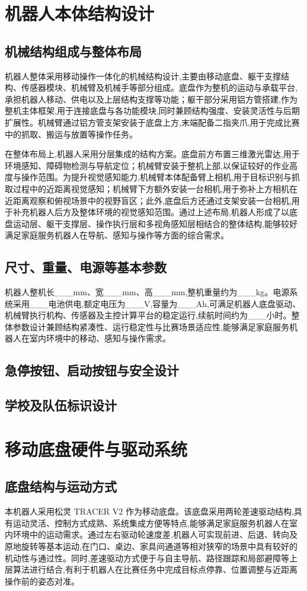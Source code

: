 \documentclass[12pt,hyperref,a4paper,UTF8]{ctexart}
\begin{document}
\section{机器人本体结构设计}
\subsection{机械结构组成与整体布局}
机器人整体采用移动操作一体化的机械结构设计,主要由移动底盘、躯干支撑结构、传感器模块、机械臂及机械手等部分组成。底盘作为整机的运动与承载平台,承担机器人移动、供电以及上层结构支撑等功能；躯干部分采用铝方管搭建,作为整机主体框架,用于连接底盘与各功能模块,同时兼顾结构强度、安装灵活性与后期扩展性。机械臂通过铝方管支架安装于底盘上方,末端配备二指夹爪,用于完成比赛中的抓取、搬运与放置等操作任务。

在整体布局上,机器人采用分层集成的结构方案。底盘前方布置三维激光雷达,用于环境感知、障碍物检测与导航定位；机械臂安装于整机上部,以保证较好的作业高度与操作范围。为提升视觉感知能力,机械臂本体配备臂上相机,用于目标识别与抓取过程中的近距离视觉感知；机械臂下方额外安装一台相机,用于弥补上方相机在近距离观察和俯视场景中的视野盲区；此外,底盘后方还通过支架安装一台相机,用于补充机器人后方及整体环境的视觉感知范围。通过上述布局,机器人形成了以底盘运动层、躯干支撑层、操作执行层和多视角感知层相结合的整体结构,能够较好满足家庭服务机器人在导航、感知与操作等方面的综合需求。
\subsection{尺寸、重量、电源等基本参数}
机器人整机长\_\_\_mm、宽\_\_\_mm、高\_\_\_mm,整机重量约为\_\_\_kg。电源系统采用\_\_\_电池供电,额定电压为\_\_\_V,容量为\_\_\_Ah,可满足机器人底盘驱动、机械臂执行机构、传感器及主控计算平台的稳定运行,续航时间约为\_\_\_小时。整体参数设计兼顾结构紧凑性、运行稳定性与比赛场景适应性,能够满足家庭服务机器人在室内环境中的移动、感知与操作需求。
\subsection{急停按钮、启动按钮与安全设计}

\subsection{学校及队伍标识设计}

\section{移动底盘硬件与驱动系统}
\subsection{底盘结构与运动方式}
本机器人采用松灵 TRACER V2 作为移动底盘。该底盘采用两轮差速驱动结构,具有运动灵活、控制方式成熟、系统集成方便等特点,能够满足家庭服务机器人在室内环境中的运动需求。通过左右驱动轮速度差,机器人可实现前进、后退、转向及原地旋转等基本运动,在门口、桌边、家具间通道等相对狭窄的场景中具有较好的机动性与通过性。同时,差速驱动方式便于与自主导航、路径跟踪和局部避障等上层算法进行结合,有利于机器人在比赛任务中完成目标点停靠、位置调整与近距离操作前的姿态对准。
\end{document}
